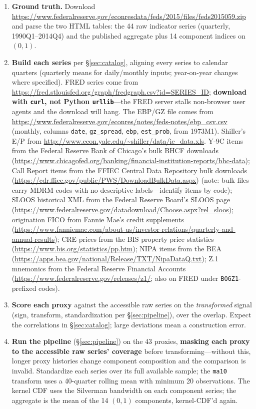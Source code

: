\documentclass[11pt]{article}
\begin{document}
\begin{enumerate}
\item \textbf{Ground truth.} Download
\url{https://www.federalreserve.gov/econresdata/feds/2015/files/feds2015059.zip}
and parse the two HTML tables: the 44 raw indicator series (quarterly,
1990Q1--2014Q4) and the published aggregate plus 14 component indices on
$(0,1)$.

\item \textbf{Build each series} per \S\ref{sec:catalog}, aligning every
series to calendar quarters (quarterly means for daily/monthly inputs;
year-on-year changes where specified).  FRED series come from
\url{https://fred.stlouisfed.org/graph/fredgraph.csv?id=SERIES_ID};
\textbf{download with \texttt{curl}, not Python \texttt{urllib}}---the
FRED server stalls non-browser user agents and the download will hang.
The EBP/GZ file comes from
\url{https://www.federalreserve.gov/econres/notes/feds-notes/ebp_csv.csv}
(monthly, columns \texttt{date}, \texttt{gz\_spread}, \texttt{ebp},
\texttt{est\_prob}, from 1973M1).  Shiller's E/P from
\url{http://www.econ.yale.edu/~shiller/data/ie_data.xls}.  Y-9C items
from the Federal Reserve Bank of Chicago's bulk BHCF downloads
(\url{https://www.chicagofed.org/banking/financial-institution-reports/bhc-data}); Call
Report items from the FFIEC Central Data Repository bulk downloads
(\url{https://cdr.ffiec.gov/public/PWS/DownloadBulkData.aspx})
(note: bulk files carry MDRM codes with no descriptive labels---identify
items by code); SLOOS historical XML from the Federal Reserve Board's
SLOOS page
(\url{https://www.federalreserve.gov/datadownload/Choose.aspx?rel=sloos});
origination FICO from Fannie Mae's credit supplements
(\url{https://www.fanniemae.com/about-us/investor-relations/quarterly-and-annual-results});
CRE prices from the BIS property price statistics
(\url{https://www.bis.org/statistics/pp.htm}); NIPA items from the BEA
(\url{https://apps.bea.gov/national/Release/TXT/NipaDataQ.txt});
Z.1 mnemonics from the Federal Reserve Financial Accounts
(\url{https://www.federalreserve.gov/releases/z1/}; also on FRED
under \texttt{BOGZ1}-prefixed codes).

\item \textbf{Score each proxy} against the accessible raw series on the
\textit{transformed} signal (sign, transform, standardization per
\S\ref{sec:pipeline}), over the overlap.  Expect the correlations in
\S\ref{sec:catalog}; large deviations mean a construction error.

\item \textbf{Run the pipeline} (\S\ref{sec:pipeline}) on the 43 proxies,
\textbf{masking each proxy to the accessible raw series' coverage}
before transforming---without this, longer proxy histories change
component composition and the comparison is invalid.  Standardize each
series over its full available sample; the \texttt{ma10} transform uses
a 40-quarter rolling mean with minimum 20 observations.  The kernel CDF
uses the Silverman bandwidth on each component series; the aggregate is
the mean of the 14 $(0,1)$ components, kernel-CDF'd again.


\end{enumerate}
\end{document}
